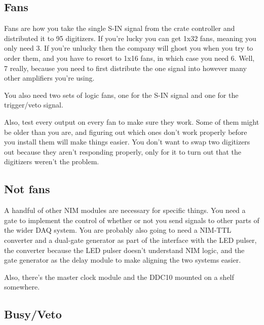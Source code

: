 \subsection{Fans}

Fans are how you take the single S-IN signal from the crate controller and distributed it to 95 digitizers.
If you're lucky you can get 1x32 fans, meaning you only need 3.
If you're unlucky then the company will ghost you when you try to order them, and you have to resort to 1x16 fans, in which case you need 6.
Well, 7 really, because you need to first distribute the one signal into however many other amplifiers you're using.

You also need two sets of logic fans, one for the S-IN signal and one for the trigger/veto signal.

Also, test every output on every fan to make sure they work.
Some of them might be older than you are, and figuring out which ones don't work properly before you install them will make things easier.
You don't want to swap two digitizers out because they aren't responding properly, only for it to turn out that the digitizers weren't the problem.

\subsection{Not fans}

A handful of other NIM modules are necessary for specific things.
You need a gate to implement the control of whether or not you send signals to other parts of the wider DAQ system.
You are probably also going to need a NIM-TTL converter and a dual-gate generator as part of the interface with the LED pulser, the converter because the LED pulser doesn't understand NIM logic, and the gate generator as the delay module to make aligning the two systems easier.

Also, there's the master clock module and the DDC10 mounted on a shelf somewhere.

\subsection{Busy/Veto}\label{sec:busyveto}

